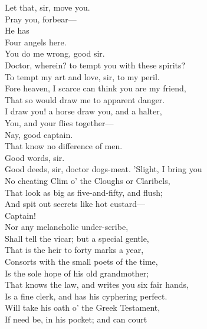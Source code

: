 \documentclass[a4paper,oneside]{memoir}
\begin{document}
\begin{drama*}
Let that, sir, move you.\\
\subtlespeaks {} Pray you, forbear---\\
\facespeaks {} He has\\
Four angels here.\\
\subtlespeaks {} You do me wrong, good sir.\\
\facespeaks Doctor, wherein? to tempt you with these spirits?\\
\subtlespeaks To tempt my art and love, sir, to my peril.\\
Fore heaven, I scarce can think you are my friend,\\
That so would draw me to apparent danger.\\
\facespeaks I draw you! a horse draw you, and a halter,\\
You, and your flies together---\\
\dapperspeaks {} Nay, good captain.\\
\facespeaks That know no difference of men.\\
\subtlespeaks {} Good words, sir.\\
\facespeaks Good deeds, sir, doctor dogs-meat. 'Slight, I bring you\\
No cheating Clim o' the Cloughs or Claribels,\\
That look as big as five-and-fifty, and flush;\\
And spit out secrets like hot custard---\\
\dapperspeaks {} Captain!\\
\facespeaks Nor any melancholic under-scribe,\\
Shall tell the vicar; but a special gentle,\\
That is the heir to forty marks a year,\\
Consorts with the small poets of the time,\\
Is the sole hope of his old grandmother;\\
That knows the law, and writes you six fair hands,\\
Is a fine clerk, and has his cyphering perfect.\\
Will take his oath o' the Greek Testament,\\
If need be, in his pocket; and can court\\

\end{drama*}
\end{document}
